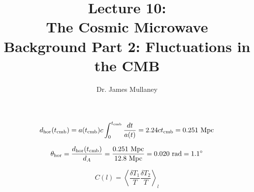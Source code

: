 \documentclass[11pt]{article}
\begin{document}
 
\title{Lecture 10:\\The Cosmic Microwave Background Part 2: Fluctuations in the CMB}
\author{Dr. James Mullaney}
\maketitle

\begin{equation}
d_{\rm hor}(t_{\rm cmb}) = a(t_{\rm cmb})c\int_0^{t_{\rm cmb}}\frac{dt}{a(t)} = 2.24ct_{\rm cmb} = 0.251~{\rm Mpc}
\end{equation}

\begin{equation}
    \theta_{\rm hor} = \frac{d_{\rm hor}(t_{\rm cmb})}{d_A} = \frac{0.251~{\rm Mpc}}{12.8~{\rm Mpc}} = 0.020~{\rm rad} = 1.1^\circ
\end{equation}

\begin{equation}
    C(l) = \left\langle\frac{\delta T_1}{T}\frac{\delta T_2}{T}\right\rangle_l
\end{equation}
\end{document}
